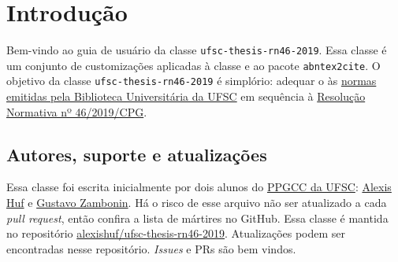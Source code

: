 \documentclass[embeddedlogo]{../ufsc-thesis-rn46-2019}
\begin{document}

\pretextual%
\imprimircapa%
\imprimirfolhaderosto*
\protect{}
\imprimirfolhadecertificacao
\listoffigures*  %
\tableofcontents*%

\textual%

\chapter{Introdução}

Bem-vindo ao guia de usuário da classe \texttt{ufsc-thesis-rn46-2019}. Essa
classe é um conjunto de customizações aplicadas à classe
\href{https://ctan.org/pkg/abntex2}{\abnTeX} e ao pacote \texttt{abntex2cite}.
O objetivo da classe \texttt{ufsc-thesis-rn46-2019} é simplório: adequar o
\abnTeX{} às \href{http://portal.bu.ufsc.br/normalizacao/}{normas emitidas pela
Biblioteca Universitária da UFSC} em sequência à
\href{https://repositorio.ufsc.br/handle/123456789/197121}{Resolução Normativa
nº 46/2019/CPG}.


\section{Autores, suporte e atualizações}

Essa classe foi escrita inicialmente por dois alunos do
\href{http://ppgcc.posgrad.ufsc.br/}{PPGCC da UFSC}:
\href{mailto:alexishuf@gmail.com}{Alexis Huf} e
\href{mailto:gustavo.zambonin@posgrad.ufsc.br}{Gustavo Zambonin}.  Há o risco de
esse arquivo não ser atualizado a cada \textit{pull request}, então confira a
lista de mártires no GitHub. Essa classe é mantida no repositório
\href{https://github.com/alexishuf/ufsc-thesis-rn46-2019/}{alexishuf/ufsc-thesis-rn46-2019}.
Atualizações podem ser encontradas nesse repositório. \textit{Issues} e PRs são
bem vindos.
\end{document}

